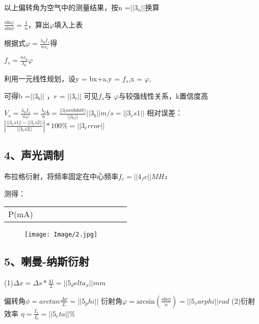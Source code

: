 \documentclass[11pt,a4paper,UTF8]{ctexart}
\begin{document}
以上偏转角为空气中的测量结果，按n =$||3_n||$换算


$\frac{\mathrm{sin}\varphi }{\mathrm{sin}\phi }=\frac{1}{n}$，算出$\varphi$填入上表

根据式$\varphi =\frac{{\lambda }_{0}{f}_{s}}{n{v}_{s}}$得

${f}_{s}=\frac{n{v}_{\delta }}{{\lambda }_{0}}\varphi $

利用一元线性规划，设y = bx+a,y = ${f}_{s}$,x = $\varphi $,

可得b =$||3_b||$ ，$r$ = $||3_r||$ 
可见${f}_{s}$与 $\varphi $与较强线性关系，k置信度高

${V}_{s}=\frac{{\lambda }_{0}{f}_{s}}{n\varphi }=\frac{{\lambda }_{0}}{n}b= \frac{{||3_lambda0 ||}}{||3_n||}||3_b||m/s = ||3_vs1||$
相对误差：$\left|\frac{||3_vs1||-||3_vs2||}{||3_vs2||}\right|*100\%=||3_error||$

\subsection*{4、声光调制}
布拉格衍射，将频率固定在中心频率${f}_{c} = ||4_fc||MHz$

测得：\begin{tabular}{|c|c|c|c|c|c|c|c|c|c|c|c|}
	\hline 
	P(mA)&{%
	\hline 
	$I_1/$格&{%
	\hline 
\end{tabular} 

\begin{figure}[H]
	\centering
	\texttt{[image: Image/2.jpg]}
\end{figure}

\subsection*{5、喇曼-纳斯衍射}
(1)$\Delta x=\Delta s*\frac{41}{2} =||5_delta_x||mm$

偏转角$\phi  =arctan\frac{\Delta x}{L} = ||5_phi||$
衍射角$\varphi =\mathrm{arcsin}\left(\frac{\mathrm{sin}\phi }{n}\right) =||5_varphi||rad$
(2)衍射效率
$\eta = \frac{{I}_{1}}{{I}_{0}} = ||5_eta||\%$
\end{document}
